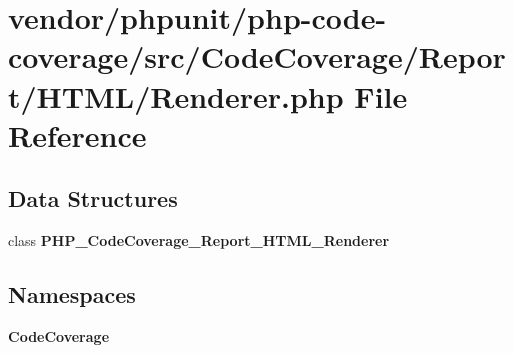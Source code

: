 \section{vendor/phpunit/php-\/code-\/coverage/src/\+Code\+Coverage/\+Report/\+H\+T\+M\+L/\+Renderer.php File Reference}
\label{_renderer_8php}
\subsection*{Data Structures}
\begin{DoxyCompactItemize}
\item 
class {\bf P\+H\+P\+\_\+\+Code\+Coverage\+\_\+\+Report\+\_\+\+H\+T\+M\+L\+\_\+\+Renderer}
\end{DoxyCompactItemize}
\subsection*{Namespaces}
\begin{DoxyCompactItemize}
\item 
 {\bf Code\+Coverage}
\end{DoxyCompactItemize}

